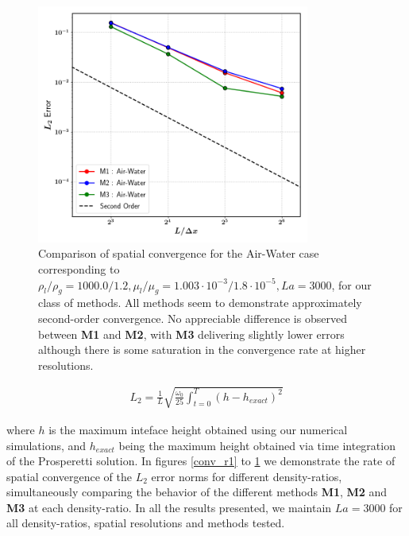 \begin{figure}[h!]
    \centering
    \includegraphics[width = 0.8\textwidth]{plots/capwave/conv_aw.png}
	\caption{Comparison of spatial convergence for the Air-Water case corresponding to $\rho_l/\rho_g = 1000.0/1.2 , \mu_l/\mu_g = 1.003\cdot 10^{-3}/1.8\cdot 10^{-5} , La = 3000 $, for our class of methods. All methods seem to demonstrate approximately second-order convergence. No appreciable difference is observed between \textbf{M1} and \textbf{M2}, with \textbf{M3} delivering slightly lower errors although there is some saturation in the convergence rate at higher resolutions. }
    \label{conv_aw}
\end{figure}

\begin{align}
	L_2 = \frac{1}{L} \sqrt{\frac{\omega_0}{25} \int_{t=0}^{T} \left(h - h_{exact}\right)^2}
\end{align}

where $h$ is the maximum inteface height obtained using our numerical simulations, and $h_{exact}$ being the maximum height obtained via time integration of the Prosperetti solution. In figures \ref{conv_r1} to \ref{conv_aw} we demonstrate the rate of spatial convergence of the $L_2$ error norms for different density-ratios, simultaneously comparing the behavior of the different methods \textbf{M1}, \textbf{M2} and \textbf{M3} at each density-ratio. In all the results presented, we maintain $La = 3000$ for all density-ratios, spatial resolutions and methods tested.  

